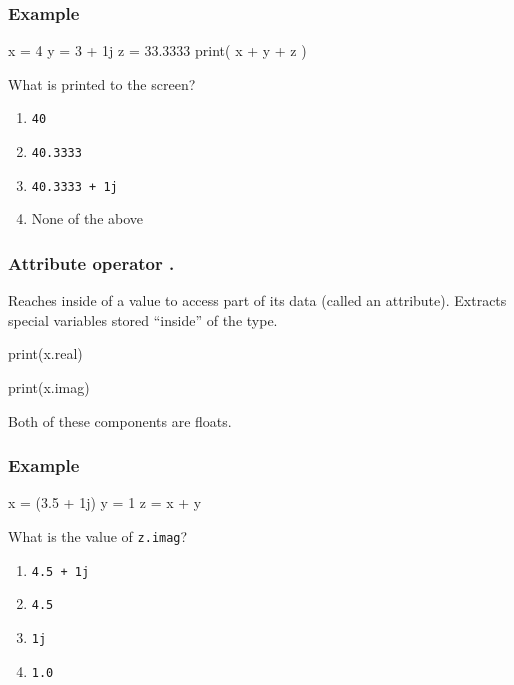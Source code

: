 \documentclass[11pt]{beamer}
\begin{document}
\begin{frame}[fragile]
  \frametitle{Example}
  \Enlarge

  \begin{semiverbatim}
x = 4
y = 3 + 1j
z = 33.3333
print( x + y + z )
  \end{semiverbatim}
  What is printed to the screen?
  \begin{enumerate}[label=\Alph*]
  \item  \texttt{40}
  \item  \texttt{40.3333}
  \item  \texttt{40.3333 + 1j}
  \item  None of the above
  \end{enumerate}
\end{frame}

\begin{frame}
  \frametitle{Attribute operator \textbf{.}}
  \Enlarge

  \begin{itemize}
  \myitem  Reaches inside of a value to access part of its data (called an attribute). \pause
  \myitem  Extracts special variables stored ``inside'' of the type.
    \begin{semiverbatim}
print(x.real)

print(x.imag)
    \end{semiverbatim} \pause
  \myitem  Both of these components are floats.
  \end{itemize}
\end{frame}

\begin{frame}[fragile]
  \frametitle{Example}
  \Enlarge

  \begin{semiverbatim}
x = (3.5 + 1j)
y = 1
z = x + y
  \end{semiverbatim}
  What is the value of \texttt{z.imag}? \pause
  \begin{enumerate}[label=\Alph*]
  \item  \texttt{4.5 + 1j}
  \item  \texttt{4.5}
  \item  \texttt{1j}
  \item  \texttt{1.0}
  \end{enumerate}
\end{frame}
\end{document}

